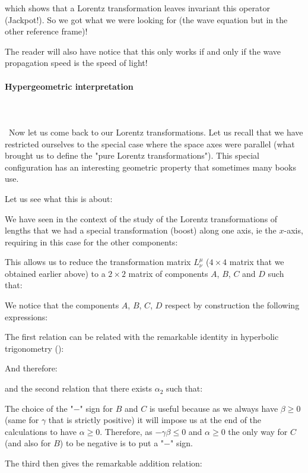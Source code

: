 	which shows that a Lorentz transformation leaves invariant this operator (Jackpot!). So we got what we were looking for (the wave equation but in the other reference frame)!

	The reader will also have notice that this only works if and only if the wave propagation speed is the speed of light!

	\paragraph{Hypergeometric interpretation}\mbox{}\\\\\
	Now let us come back to our Lorentz transformations. Let us recall that we have restricted ourselves to the special case where the space axes were parallel (what brought us to define the "pure Lorentz transformations"). This special configuration has an interesting geometric property that sometimes many books use.

	Let us see what this is about:
	
	We have seen in the context of the study of the Lorentz transformations of lengths that we had a special transformation (boost) along one axis, ie the $x$-axis, requiring in this case for the other components:
	
	This allows us to  reduce the transformation matrix $L_\nu^\mu$ ($4\times 4$ matrix that we obtained earlier above) to a $2\times 2$ matrix of components $A$, $B$, $C$ and $D$ such that:
	
	We notice that the components $A$, $B$, $C$, $D$ respect by construction the following expressions:
	
	The first relation can be related with the remarkable identity in hyperbolic trigonometry ():
	
	And therefore:
	
	and the second relation that there exists $\alpha_2$ such that:
	
	\begin{tcolorbox}[title=Remark,colframe=black,arc=10pt]
	The choice of the "$-$" sign for $B$ and $C$ is useful because as we always have $\beta \geq 0$ (same for $\gamma$ that is strictly positive) it will impose us at the end of the calculations to have $\alpha\geq 0$. Therefore, as $-\gamma\beta\leq 0$ and $\alpha\geq 0$ the only way for $C$ (and also for $B$) to be negative is to put a "$-$" sign.
	\end{tcolorbox}	
	The third then gives the remarkable addition relation:
	
